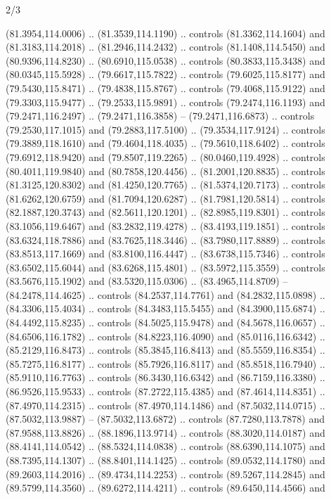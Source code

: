 \begin{flagdescription}{2/3}
\begin{scope}[shift={(0.5\flaglength,0.5)},scale=\flagwidth/320]
\begin{scope}[y=0.8pt, x=0.8pt, yscale=-1,shift={(-118.3,-146)}]
  (81.3954,114.0006) .. (81.3539,114.1190) .. controls (81.3362,114.1604) and
  (81.3183,114.2018) .. (81.2946,114.2432) .. controls (81.1408,114.5450) and
  (80.9396,114.8230) .. (80.6910,115.0538) .. controls (80.3833,115.3438) and
  (80.0345,115.5928) .. (79.6617,115.7822) .. controls (79.6025,115.8177) and
  (79.5430,115.8471) .. (79.4838,115.8767) .. controls (79.4068,115.9122) and
  (79.3303,115.9477) .. (79.2533,115.9891) .. controls (79.2474,116.1193) and
  (79.2471,116.2497) .. (79.2471,116.3858) -- (79.2471,116.6873) .. controls
  (79.2530,117.1015) and (79.2883,117.5100) .. (79.3534,117.9124) .. controls
  (79.3889,118.1610) and (79.4604,118.4035) .. (79.5610,118.6402) .. controls
  (79.6912,118.9420) and (79.8507,119.2265) .. (80.0460,119.4928) .. controls
  (80.4011,119.9840) and (80.7858,120.4456) .. (81.2001,120.8835) .. controls
  (81.3125,120.8302) and (81.4250,120.7765) .. (81.5374,120.7173) .. controls
  (81.6262,120.6759) and (81.7094,120.6287) .. (81.7981,120.5814) .. controls
  (82.1887,120.3743) and (82.5611,120.1201) .. (82.8985,119.8301) .. controls
  (83.1056,119.6467) and (83.2832,119.4278) .. (83.4193,119.1851) .. controls
  (83.6324,118.7886) and (83.7625,118.3446) .. (83.7980,117.8889) .. controls
  (83.8513,117.1669) and (83.8100,116.4447) .. (83.6738,115.7346) .. controls
  (83.6502,115.6044) and (83.6268,115.4801) .. (83.5972,115.3559) .. controls
  (83.5676,115.1902) and (83.5320,115.0306) .. (83.4965,114.8709) --
  (84.2478,114.4625) .. controls (84.2537,114.7761) and (84.2832,115.0898) ..
  (84.3306,115.4034) .. controls (84.3483,115.5455) and (84.3900,115.6874) ..
  (84.4492,115.8235) .. controls (84.5025,115.9478) and (84.5678,116.0657) ..
  (84.6506,116.1782) .. controls (84.8223,116.4090) and (85.0116,116.6342) ..
  (85.2129,116.8473) .. controls (85.3845,116.8413) and (85.5559,116.8354) ..
  (85.7275,116.8177) .. controls (85.7926,116.8117) and (85.8518,116.7940) ..
  (85.9110,116.7763) .. controls (86.3430,116.6342) and (86.7159,116.3380) ..
  (86.9526,115.9533) .. controls (87.2722,115.4385) and (87.4614,114.8351) ..
  (87.4970,114.2315) .. controls (87.4970,114.1486) and (87.5032,114.0715) ..
  (87.5032,113.9887) -- (87.5032,113.6872) .. controls (87.7280,113.7878) and
  (87.9588,113.8826) .. (88.1896,113.9714) .. controls (88.3020,114.0187) and
  (88.4141,114.0542) .. (88.5324,114.0838) .. controls (88.6390,114.1075) and
  (88.7395,114.1307) .. (88.8401,114.1425) .. controls (89.0532,114.1780) and
  (89.2603,114.2016) .. (89.4734,114.2253) .. controls (89.5267,114.2845) and
  (89.5799,114.3560) .. (89.6272,114.4211) .. controls (89.6450,114.4566) and

\end{scope}
\end{scope}
\end{flagdescription}
